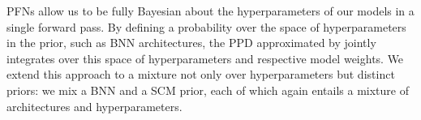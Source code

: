 \documentclass{article}
\DeclareMathOperator*{\E}{\mathbb{E}}
\newcommand{\frank}[1]{\todo[inline,color=yellow]{Frank: #1}}
\newcommand{\sam}[1]{\todo[inline,color=green]{Sam: #1}}
\begin{document}
PFNs allow us to be fully Bayesian about the hyperparameters of our models in a single forward pass. By defining a probability over the space of hyperparameters in the prior, such as BNN architectures, the PPD approximated by \methodname{} jointly integrates over this space of hyperparameters and respective model weights.
We extend this approach to a mixture not only over hyperparameters but distinct priors: we mix a BNN and a SCM prior,
each of which again entails a mixture of architectures and hyperparameters.
%
\end{document}
